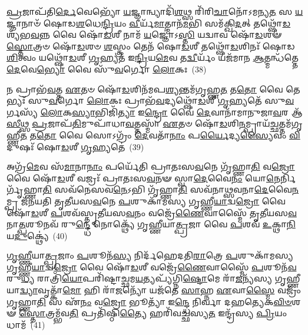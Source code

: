 {\anuvakamend[{\-\ul{𑌦𑌿}\-𑌕𑍍𑌷𑍍𑌵᳴𑌨𑌿𑌤𑌿 𑌵𑌿𑍞\-\ul{𑌶}\-𑌤𑌿𑌶𑍍𑌚᳴}]}%

\-\ul{𑌪𑍍𑌰}\-𑌜𑌾𑌪᳴𑌤𑌿\-\ul{𑌰𑍍𑌦𑍇}\-𑌵𑍇𑌭𑍍𑌯𑍋᳴ \ul{𑌯}\-𑌜𑍍𑌞𑌾𑌨𑍍𑌵𑍍𑌯𑌾𑌦𑌿᳴\-\ul{𑌶}\-𑌥𑍍𑌸 𑌰𑌿᳴𑌰𑌿\-\ul{𑌚𑌾}\-𑌨𑍋᳴\-𑌽𑌮𑌨𑍍𑌯\-\ul{𑌤} 𑌸 \ul{𑌯}\-𑌜𑍍𑌞𑌾𑌨𑌾𑍞᳴ 𑌷𑍋𑌡\-\ul{𑌶}\-𑌧𑍇\-\ul{𑌨𑍍𑌦𑍍𑌰𑌿}\-𑌯𑌂 \ul{𑌵𑍀}\-𑌰𑍍𑌯᳴\-\ul{𑌮𑌾}\-𑌤𑍍𑌮𑌾𑌨᳴\-\ul{𑌮}\-𑌭𑌿 𑌸𑌮᳴𑌕𑍍𑌖𑌿\-\ul{𑌦}\-𑌤𑍍 𑌤𑌥𑍍𑌷𑍋᳴\-\ul{𑌡}\-𑌶𑍍𑌯᳴𑌭\-\ul{𑌵}\-𑌨𑍍𑌨 𑌵𑍈 𑌷𑍋᳴\-\ul{𑌡}\-𑌶𑍀 𑌨𑌾𑌮᳴ \ul{𑌯}\-𑌜𑍍𑌞𑍋॑\-𑌽\-\ul{𑌸𑍍𑌤𑌿} 𑌯𑌦𑍍𑌵𑌾𑌵 𑌷𑍋᳴\-\ul{𑌡}\-𑌶𑍟 \ul{𑌸𑍍𑌤𑍋}\-𑌤𑍍𑌰𑍞 𑌷𑍋᳴\-\ul{𑌡}\-𑌶𑍞 \ul{𑌶}\-𑌸𑍍𑌤𑍍𑌰𑌂 𑌤𑍇𑌨᳴ 𑌷𑍋\-\ul{𑌡}\-𑌶𑍀 𑌤𑌥𑍍𑌷𑍋᳴\-\ul{𑌡}\-𑌶𑌿𑌨𑌃᳴ 𑌷𑍋𑌡\-\ul{𑌶𑌿}\-𑌤𑍍𑌵𑌂 𑌯𑌥𑍍𑌷𑍋᳴\-\ul{𑌡}\-𑌶𑍀 \ul{𑌗𑍃}\-𑌹𑍍𑌯𑌤᳴ 𑌇\-\ul{𑌨𑍍𑌦𑍍𑌰𑌿}\-𑌯\-\ul{𑌮𑍇}\-𑌵 𑌤\-\ul{𑌦𑍍𑌵𑍀}\-𑌰𑍍𑌯𑌂᳴ 𑌯𑌜᳴𑌮𑌾𑌨 \ul{𑌆}\-𑌤𑍍𑌮𑌨𑍍𑌧᳴𑌤𑍍𑌤𑍇 \ul{𑌦𑍇}\-𑌵𑍇\-\ul{𑌭𑍍𑌯𑍋} 𑌵𑍈 𑌸𑍁᳴\-\ul{𑌵}\-𑌰𑍍𑌗𑍋 \ul{𑌲𑍋}\-𑌕𑌃~(38)

𑌨 𑌪𑍍𑌰𑌾𑌭᳴\-\ul{𑌵}\-𑌤𑍍𑌤 \ul{𑌏}\-𑌤𑍞 𑌷𑍋᳴\-\ul{𑌡}\-𑌶𑌿𑌨᳴𑌮𑌪\-\ul{𑌶𑍍𑌯}\-𑌨𑍍𑌤𑌮᳴𑌗𑍃𑌹𑍍𑌣\-\ul{𑌤} 𑌤\-\ul{𑌤𑍋} 𑌵𑍈 𑌤𑍇𑌭𑍍𑌯𑌃᳴ 𑌸𑍁\-\ul{𑌵}\-𑌰𑍍𑌗𑍋 \ul{𑌲𑍋}\-𑌕𑌃 𑌪𑍍𑌰𑌾𑌭᳴\-\ul{𑌵}\-𑌦𑍍𑌯𑌥𑍍𑌷𑍋᳴\-\ul{𑌡}\-𑌶𑍀 \ul{𑌗𑍃}\-𑌹𑍍𑌯𑌤𑍇᳴ 𑌸𑍁\-\ul{𑌵}\-𑌰𑍍𑌗𑌸𑍍𑌯᳴ \ul{𑌲𑍋}\-𑌕\-\ul{𑌸𑍍𑌯𑌾}\-𑌭𑌿𑌜𑌿᳴\-\ul{𑌤𑍍𑌯𑌾} 𑌇\-\ul{𑌨𑍍𑌦𑍍𑌰𑍋} 𑌵𑍈 \ul{𑌦𑍇}\-𑌵𑌾𑌨𑌾᳴𑌮𑌾𑌨𑍁𑌜𑌾\-\ul{𑌵}\-𑌰 𑌆᳴\-\ul{𑌸𑍀}\-𑌥𑍍𑌸 \ul{𑌪𑍍𑌰}\-𑌜𑌾𑌪᳴\-\ul{𑌤𑌿}\-𑌮𑍁𑌪𑌾᳴𑌧𑌾\-\ul{𑌵}\-𑌤𑍍𑌤𑌸𑍍𑌮𑌾᳴ \ul{𑌏}\-𑌤𑍞 𑌷𑍋᳴\-\ul{𑌡}\-𑌶𑌿\-\ul{𑌨}\-𑌮𑍍𑌪𑍍𑌰𑌾𑌯᳴\-\ul{𑌚𑍍𑌛}\-𑌤𑍍𑌤𑌮᳴𑌗𑍃𑌹𑍍𑌣𑍀\-\ul{𑌤} 𑌤\-\ul{𑌤𑍋} 𑌵𑍈 𑌸𑍋\-𑌽𑌗𑍍𑌰𑌂᳴ \ul{𑌦𑍇}\-𑌵𑌤𑌾᳴\-\ul{𑌨𑌾𑌂} 𑌪\-\ul{𑌰𑍍𑌯𑍈}\-𑌦𑍍𑌯\-\ul{𑌸𑍍𑌯𑍈}\-𑌵𑌂 \ul{𑌵𑌿}\-𑌦𑍁𑌷𑌃᳴ 𑌷𑍋\-\ul{𑌡}\-𑌶𑍀 \ul{𑌗𑍃}\-𑌹𑍍𑌯𑌤𑍇॑~(39)

𑌅𑌗𑍍𑌰᳴\-\ul{𑌮𑍇}\-𑌵 𑌸᳴\-\ul{𑌮𑌾}\-𑌨𑌾\-\ul{𑌨𑌾𑌂} 𑌪𑌰𑍍𑌯𑍇᳴𑌤𑌿 𑌪𑍍𑌰𑌾𑌤𑌃𑌸\-\ul{𑌵}\-𑌨𑍇 𑌗𑍃᳴𑌹𑍍𑌣𑌾\-\ul{𑌤𑌿} 𑌵\-\ul{𑌜𑍍𑌰𑍋} 𑌵𑍈 𑌷𑍋᳴\-\ul{𑌡}\-𑌶𑍀 𑌵𑌜𑍍𑌰𑌃᳴ 𑌪𑍍𑌰𑌾𑌤𑌃𑌸\-\ul{𑌵}\-𑌨𑍟 𑌸𑍍𑌵𑌾\-\ul{𑌦𑍇}\-𑌵𑍈\-\ul{𑌨𑌂} 𑌯𑍋\-\ul{𑌨𑍇}\-𑌰𑍍𑌨𑌿𑌰𑍍𑌗𑍃᳴𑌹𑍍𑌣𑌾\-\ul{𑌤𑌿} 𑌸𑌵᳴𑌨𑍇𑌸𑌵\-\ul{𑌨𑍇}\-\-𑌽𑌭𑌿 𑌗𑍃᳴𑌹𑍍𑌣𑌾\-\ul{𑌤𑌿} 𑌸𑌵᳴𑌨𑌾𑌥𑍍𑌸𑌵𑌨𑌾\-\ul{𑌦𑍇}\-𑌵𑍈\-\ul{𑌨}\-𑌮𑍍𑌪𑍍𑌰 𑌜᳴𑌨𑌯𑌤𑌿 𑌤𑍃𑌤𑍀𑌯𑌸\-\ul{𑌵}\-𑌨𑍇 \ul{𑌪}\-𑌶𑍁𑌕𑌾᳴𑌮𑌸𑍍𑌯 𑌗𑍃𑌹𑍍𑌣𑍀\-\ul{𑌯𑌾}\-𑌦𑍍𑌵\-\ul{𑌜𑍍𑌰𑍋} 𑌵𑍈 𑌷𑍋᳴\-\ul{𑌡}\-𑌶𑍀 \ul{𑌪}\-𑌶𑌵᳴𑌸𑍍𑌤𑍃𑌤𑍀𑌯𑌸\-\ul{𑌵}\-𑌨𑌂 𑌵𑌜𑍍𑌰𑍇᳴\-\ul{𑌣𑍈}\-𑌵𑌾𑌸𑍍𑌮𑍈᳴ 𑌤𑍃𑌤𑍀𑌯𑌸\-\ul{𑌵}\-𑌨𑌾\-\ul{𑌤𑍍𑌪}\-𑌶𑍂𑌨𑌵᳴ 𑌰𑍁\-\ul{𑌨𑍍𑌦𑍍𑌧𑍇} 𑌨𑍋𑌕𑍍𑌥𑍍𑌯𑍇᳴ 𑌗𑍃𑌹𑍍𑌣𑍀𑌯𑌾\-\ul{𑌤𑍍𑌪𑍍𑌰}\-𑌜𑌾 𑌵𑍈 \ul{𑌪}\-𑌶𑌵᳴ \ul{𑌉}\-𑌕𑍍𑌥𑌾\-\ul{𑌨𑌿} 𑌯\-\ul{𑌦𑍁}\-𑌕𑍍𑌥𑍍𑌯𑍇॑~(40)

\-\ul{𑌗𑍃}\-\-\ul{𑌹𑍍𑌣𑍀}\-𑌯𑌾\-\ul{𑌤𑍍𑌪𑍍𑌰}\-𑌜𑌾𑌂 \ul{𑌪}\-𑌶𑍂𑌨᳴\-\ul{𑌸𑍍𑌯} 𑌨𑌿𑌰𑍍𑌦᳴𑌹𑍇𑌦𑌤𑌿\-\ul{𑌰𑌾}\-𑌤𑍍𑌰𑍇 \ul{𑌪}\-𑌶𑍁𑌕𑌾᳴𑌮𑌸𑍍𑌯 𑌗𑍃𑌹𑍍𑌣𑍀\-\ul{𑌯𑌾}\-𑌦𑍍𑌵\-\ul{𑌜𑍍𑌰𑍋} 𑌵𑍈 𑌷𑍋᳴\-\ul{𑌡}\-𑌶𑍀 𑌵𑌜𑍍𑌰𑍇᳴\-\ul{𑌣𑍈}\-𑌵𑌾𑌸𑍍𑌮𑍈᳴ \ul{𑌪}\-𑌶𑍂𑌨᳴\-\ul{𑌵}\-𑌰𑍁\-\ul{𑌧𑍍𑌯} 𑌰𑌾𑌤𑍍𑌰𑌿᳴\-\ul{𑌯𑍋}\-𑌪𑌰𑌿᳴𑌷𑍍𑌟𑌾𑌚𑍍𑌛𑌮\-\ul{𑌯}\-𑌤𑍍𑌯𑌪𑍍𑌯᳴𑌗𑍍𑌨𑌿\-\ul{𑌷𑍍𑌟𑍋}\-𑌮𑍇 𑌰𑌾᳴\-\ul{𑌜}\-𑌨𑍍𑌯᳴𑌸𑍍𑌯 𑌗𑍃𑌹𑍍𑌣𑍀𑌯𑌾\-\ul{𑌦𑍍𑌵𑍍𑌯𑌾}\-𑌵𑍃𑌤𑍍𑌕𑌾᳴\-\ul{𑌮𑍋} 𑌹𑌿 𑌰𑌾᳴\-\ul{𑌜}\-𑌨𑍍𑌯𑍋᳴ 𑌯𑌜᳴𑌤𑍇 \ul{𑌸𑌾}\-𑌹𑍍𑌨 \ul{𑌏}\-𑌵𑌾\-\ul{𑌸𑍍𑌮𑍈} 𑌵𑌜𑍍𑌰𑌂᳴ 𑌗𑍃𑌹𑍍𑌣𑌾\-\ul{𑌤𑌿} 𑌸 𑌏᳴\-\ul{𑌨𑌂} 𑌵\-\ul{𑌜𑍍𑌰𑍋} 𑌭𑍂𑌤𑍍𑌯𑌾᳴ 𑌇\-\ul{𑌨𑍍𑌦𑍍𑌧𑍇} 𑌨𑌿𑌰𑍍𑌵𑌾 𑌦𑌹𑌤𑍍𑌯𑍇𑌕\-\ul{𑌵𑌿}\-\-\ul{𑍞}\-𑌶𑍟 \ul{𑌸𑍍𑌤𑍋}\-𑌤𑍍𑌰𑌮𑍍𑌭᳴𑌵\-\ul{𑌤𑌿} 𑌪𑍍𑌰𑌤𑌿᳴𑌷𑍍𑌠𑌿\-\ul{𑌤𑍍𑌯𑍈} 𑌹𑌰𑌿᳴𑌵𑌚𑍍𑌛𑌸𑍍𑌯\-\ul{𑌤} 𑌇𑌨𑍍𑌦𑍍𑌰᳴𑌸𑍍𑌯 \ul{𑌪𑍍𑌰𑌿}\-𑌯𑌂 𑌧𑌾𑌮᳴~(41)

